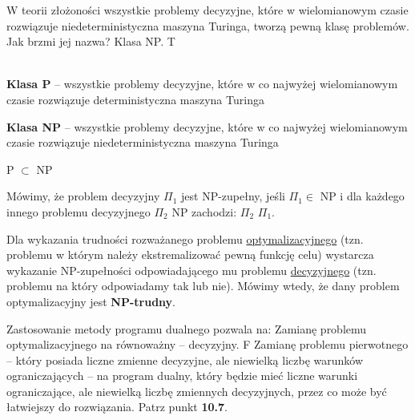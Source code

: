 \answer
{W teorii złożoności wszystkie problemy decyzyjne, które w wielomianowym czasie rozwiązuje niedeterministyczna maszyna Turinga, tworzą pewną klasę problemów. Jak brzmi jej nazwa?}
{Klasa NP.}
{T}
{}
{ \\
\textbf{Klasa P} --  wszystkie problemy decyzyjne, które w co najwyżej wielomianowym czasie rozwiązuje deterministyczna maszyna Turinga

\textbf{Klasa NP} -- wszystkie problemy decyzyjne, które w co najwyżej wielomianowym czasie rozwiązuje niedeterministyczna maszyna Turinga 

P $\subset$ NP 

Mówimy, że problem decyzyjny $\Pi_1$ jest NP-zupełny, jeśli $\Pi_1 \in$ NP i dla każdego innego problemu decyzyjnego $\Pi_2$  NP zachodzi: $\Pi_2$  $\Pi_1$.

Dla wykazania trudności rozważanego problemu \underline{optymalizacyjnego} (tzn. problemu w którym należy ekstremalizować pewną funkcję celu) wystarcza wykazanie NP-zupełności odpowiadającego mu problemu \underline{decyzyjnego} (tzn. problemu na który odpowiadamy tak lub nie). Mówimy wtedy, że dany problem optymalizacyjny jest \textbf{NP-trudny}.
}





\answer
{Zastosowanie metody programu dualnego pozwala na:}
{Zamianę problemu optymalizacyjnego na równoważny -- decyzyjny.}
{F}
{Zamianę problemu pierwotnego -- który posiada liczne zmienne decyzyjne, ale niewielką liczbę warunków ograniczających -- na program dualny, który będzie mieć liczne warunki ograniczające, ale niewielką liczbę zmiennych decyzyjnych, przez co może być łatwiejszy do rozwiązania.
}
{ Patrz punkt \textbf{10.7}.
}




